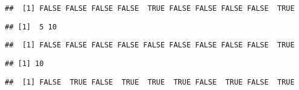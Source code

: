 \begin{verbatim}
##  [1] FALSE FALSE FALSE FALSE  TRUE FALSE FALSE FALSE FALSE  TRUE
\end{verbatim}

\begin{Shaded}
\begin{Highlighting}[]
\StringTok{ }
\end{Highlighting}
\end{Shaded}

\begin{verbatim}
## [1]  5 10
\end{verbatim}

\begin{Shaded}
\begin{Highlighting}[]
\OperatorTok{&}\StringTok{ }
\end{Highlighting}
\end{Shaded}

\begin{verbatim}
##  [1] FALSE FALSE FALSE FALSE FALSE FALSE FALSE FALSE FALSE  TRUE
\end{verbatim}

\begin{Shaded}
\begin{Highlighting}[]
\end{Highlighting}
\end{Shaded}

\begin{verbatim}
## [1] 10
\end{verbatim}

\begin{Shaded}
\begin{Highlighting}[]
\OperatorTok{|}\StringTok{ }
\end{Highlighting}
\end{Shaded}

\begin{verbatim}
##  [1] FALSE  TRUE FALSE  TRUE  TRUE  TRUE FALSE  TRUE FALSE  TRUE
\end{verbatim}

\begin{Shaded}
\begin{Highlighting}[]
\end{Highlighting}
\end{Shaded}

